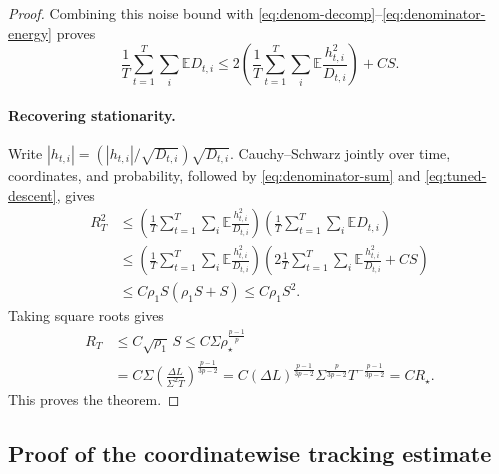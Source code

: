 \documentclass[11pt,letterpaper]{article}
\theoremstyle{definition}
\newcommand{\E}{\mathbb E}
\begin{document}
\begin{proof}
Combining this noise bound with
\eqref{eq:denom-decomp}--\eqref{eq:denominator-energy} proves
\begin{equation}
\frac1T\sum_{t=1}^T\sum_i\E D_{t,i}
\le 2\left(\frac1T\sum_{t=1}^T\sum_i
\E\frac{h_{t,i}^2}{D_{t,i}}\right)+CS.
\label{eq:denominator-sum}
\end{equation}
\paragraph{Recovering stationarity.}
Write $|h_{t,i}|=(|h_{t,i}|/\sqrt{D_{t,i}})\sqrt{D_{t,i}}$.
Cauchy--Schwarz jointly over time, coordinates, and probability,
followed by \eqref{eq:denominator-sum} and \eqref{eq:tuned-descent}, gives
\begin{align*}
R_T^2
&\le
\left(\frac1T\sum_{t=1}^T\sum_i\E\frac{h_{t,i}^2}{D_{t,i}}\right)
\left(\frac1T\sum_{t=1}^T\sum_i\E D_{t,i}\right)\\
&\le
\left(\frac1T\sum_{t=1}^T\sum_i\E\frac{h_{t,i}^2}{D_{t,i}}\right)
\left(2\frac1T\sum_{t=1}^T\sum_i
\E\frac{h_{t,i}^2}{D_{t,i}}+CS\right)\\
&\le C\rho_1S(\rho_1S+S)\le C\rho_1S^2.
\end{align*}
Taking square roots gives
\begin{align*}
R_T&\le C\sqrt{\rho_1}\,S
\le C\Sigma\rho_\star^{\frac{p-1}{p}}\\
&=C\Sigma\left(\frac{\Delta L}{\Sigma^2T}\right)^{\frac{p-1}{3p-2}}
=C(\Delta L)^{\frac{p-1}{3p-2}}
\Sigma^{\frac{p}{3p-2}}T^{-\frac{p-1}{3p-2}}=CR_\star.
\end{align*}
This proves the theorem.
\end{proof}

\subsection{Proof of the coordinatewise tracking estimate}
\label{app:selfnorm}
\end{document}
